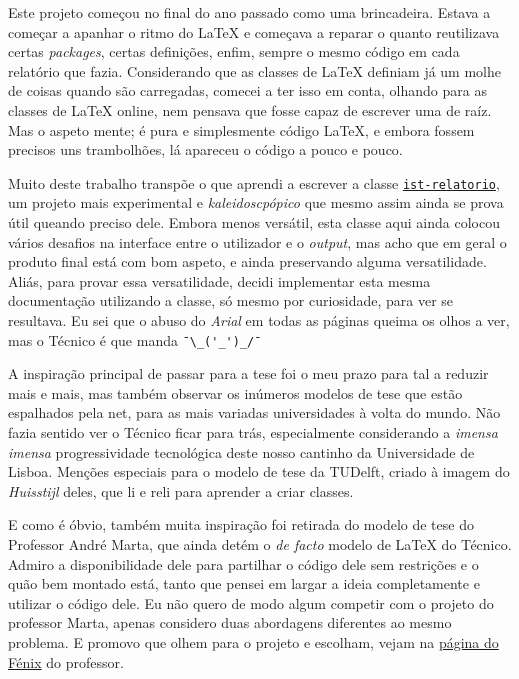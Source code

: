 \documentclass{../ist-thesis}
\begin{document}
Este projeto começou no final do ano passado como uma brincadeira. Estava a começar a apanhar o ritmo do \LaTeX{} e começava a reparar o quanto reutilizava certas \textit{packages}, certas definições, enfim, sempre o mesmo código em cada relatório que fazia. Considerando que as classes de \LaTeX{} definiam já um molhe de coisas quando são carregadas, comecei a ter isso em conta, olhando para as classes de \LaTeX{} online, nem pensava que fosse capaz de escrever uma de raíz. Mas o aspeto mente; é pura e simplesmente código \LaTeX{}, e embora fossem precisos uns trambolhões, lá apareceu o código a pouco e pouco.

Muito deste trabalho transpõe o que aprendi a escrever a classe \href{https://github.com/ekspek/ist-relatorio}{\texttt{ist-relatorio}}, um projeto mais experimental e \textit{kaleidoscpópico} que mesmo assim ainda se prova útil queando preciso dele. Embora menos versátil, esta classe aqui ainda colocou vários desafios na interface entre o utilizador e o \textit{output}, mas acho que em geral o produto final está com bom aspeto, e ainda preservando alguma versatilidade. Aliás, para provar essa versatilidade, decidi implementar esta mesma documentação utilizando a classe, só mesmo por curiosidade, para ver se resultava. Eu sei que o abuso do \textit{Arial} em todas as páginas queima os olhos a ver, mas o Técnico é que manda \verb|¯\_('_')_/¯|

A inspiração principal de passar para a tese foi o meu prazo para tal a reduzir mais e mais, mas também observar os inúmeros modelos de tese que estão espalhados pela net, para as mais variadas universidades à volta do mundo. Não fazia sentido ver o Técnico ficar para trás, especialmente considerando a \textit{imensa imensa} progressividade tecnológica deste nosso cantinho da Universidade de Lisboa. Menções especiais para o modelo de tese da TUDelft, criado à imagem do \textit{Huisstijl} deles, que li e reli para aprender a criar classes.

E como é óbvio, também muita inspiração foi retirada do modelo de tese do Professor André Marta, que ainda detém o \textit{de facto} modelo de \LaTeX{} do Técnico. Admiro a disponibilidade dele para partilhar o código dele sem restrições e o quão bem montado está, tanto que pensei em largar a ideia completamente e utilizar o código dele. Eu não quero de modo algum competir com o projeto do professor Marta, apenas considero duas abordagens diferentes ao mesmo problema. E promovo que olhem para o projeto e escolham, vejam na \href{https://fenix.tecnico.ulisboa.pt/homepage/ist31052/documentos-para-elaboracao-da-tese}{página do Fénix} do professor.
\end{document}
